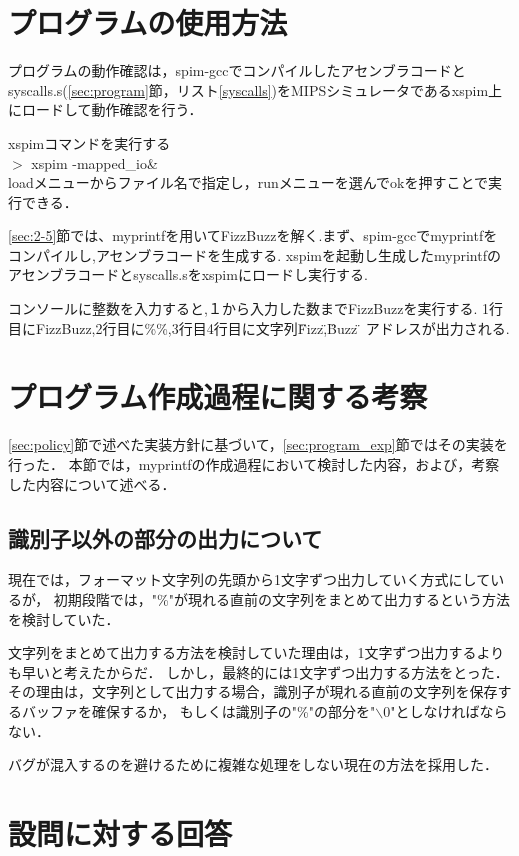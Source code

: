 \documentclass[11pt]{jarticle}
\begin{document}
\section{プログラムの使用方法}

プログラムの動作確認は，spim-gccでコンパイルしたアセンブラコードと
syscalls.s(\ref{sec:program}節，リスト\ref{syscalls})をMIPSシミュレータであるxspim上にロードして動作確認を行う．

xspimコマンドを実行する\\
$>$ xspim -mapped\_io\&\\

loadメニューからファイル名で指定し，runメニューを選んでokを押すことで実行できる．

\ref{sec:2-5}節では、myprintfを用いてFizzBuzzを解く.まず、spim-gccでmyprintfを
コンパイルし,アセンブラコードを生成する.
xspimを起動し生成したmyprintfのアセンブラコードとsyscalls.sをxspimにロードし実行する.

コンソールに整数を入力すると,１から入力した数までFizzBuzzを実行する.
1行目にFizzBuzz,2行目に\%\%,3行目4行目に文字列\"Fizz\",\"Buzz\"の
アドレスが出力される.

\section{プログラム作成過程に関する考察}

\ref{sec:policy}節で述べた実装方針に基づいて，\ref{sec:program_exp}節ではその実装を行った．
本節では，myprintfの作成過程において検討した内容，および，考察した内容について述べる．

\subsection{識別子以外の部分の出力について}

現在では，フォーマット文字列の先頭から1文字ずつ出力していく方式にしているが，
初期段階では，"\%"が現れる直前の文字列をまとめて出力するという方法を検討していた．

文字列をまとめて出力する方法を検討していた理由は，1文字ずつ出力するよりも早いと考えたからだ．
しかし，最終的には1文字ずつ出力する方法をとった．
その理由は，文字列として出力する場合，識別子が現れる直前の文字列を保存するバッファを確保するか，
もしくは識別子の"\%"の部分を"$\backslash$0"としなければならない．

バグが混入するのを避けるために複雑な処理をしない現在の方法を採用した．

\section{設問に対する回答}
\end{document}
